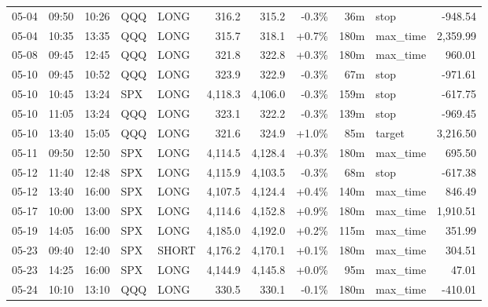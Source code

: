 \documentclass[11pt,a4paper,twoside]{article}
\begin{document}
\begin{center}
\begin{longtable}{>{\color{txtmain}}l l l l l r r r r >{\color{txtmain}}l r}
05-04 & 09:50 & 10:26 & QQQ & LONG & 316.2 & 315.2 & \textcolor{lossred}{-0.3\%} & 36m & stop & \textcolor{lossred}{-948.54} \\
05-04 & 10:35 & 13:35 & QQQ & LONG & 315.7 & 318.1 & \textcolor{wingreen}{+0.7\%} & 180m & max\_time & \textcolor{wingreen}{2,359.99} \\
05-08 & 09:45 & 12:45 & QQQ & LONG & 321.8 & 322.8 & \textcolor{wingreen}{+0.3\%} & 180m & max\_time & \textcolor{wingreen}{960.01} \\
05-10 & 09:45 & 10:52 & QQQ & LONG & 323.9 & 322.9 & \textcolor{lossred}{-0.3\%} & 67m & stop & \textcolor{lossred}{-971.61} \\
05-10 & 10:45 & 13:24 & SPX & LONG & 4,118.3 & 4,106.0 & \textcolor{lossred}{-0.3\%} & 159m & stop & \textcolor{lossred}{-617.75} \\
05-10 & 11:05 & 13:24 & QQQ & LONG & 323.1 & 322.2 & \textcolor{lossred}{-0.3\%} & 139m & stop & \textcolor{lossred}{-969.45} \\
05-10 & 13:40 & 15:05 & QQQ & LONG & 321.6 & 324.9 & \textcolor{wingreen}{+1.0\%} & 85m & target & \textcolor{wingreen}{3,216.50} \\
05-11 & 09:50 & 12:50 & SPX & LONG & 4,114.5 & 4,128.4 & \textcolor{wingreen}{+0.3\%} & 180m & max\_time & \textcolor{wingreen}{695.50} \\
05-12 & 11:40 & 12:48 & SPX & LONG & 4,115.9 & 4,103.5 & \textcolor{lossred}{-0.3\%} & 68m & stop & \textcolor{lossred}{-617.38} \\
05-12 & 13:40 & 16:00 & SPX & LONG & 4,107.5 & 4,124.4 & \textcolor{wingreen}{+0.4\%} & 140m & max\_time & \textcolor{wingreen}{846.49} \\
05-17 & 10:00 & 13:00 & SPX & LONG & 4,114.6 & 4,152.8 & \textcolor{wingreen}{+0.9\%} & 180m & max\_time & \textcolor{wingreen}{1,910.51} \\
05-19 & 14:05 & 16:00 & SPX & LONG & 4,185.0 & 4,192.0 & \textcolor{wingreen}{+0.2\%} & 115m & max\_time & \textcolor{wingreen}{351.99} \\
05-23 & 09:40 & 12:40 & SPX & SHORT & 4,176.2 & 4,170.1 & \textcolor{wingreen}{+0.1\%} & 180m & max\_time & \textcolor{wingreen}{304.51} \\
05-23 & 14:25 & 16:00 & SPX & LONG & 4,144.9 & 4,145.8 & \textcolor{wingreen}{+0.0\%} & 95m & max\_time & \textcolor{wingreen}{47.01} \\
05-24 & 10:10 & 13:10 & QQQ & LONG & 330.5 & 330.1 & \textcolor{lossred}{-0.1\%} & 180m & max\_time & \textcolor{lossred}{-410.01} \\

\end{longtable}
\end{center}
\end{document}
